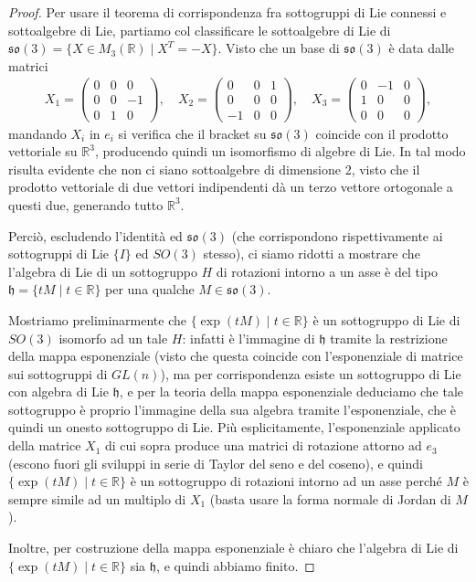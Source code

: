 \documentclass[a4paper]{article}
\newcommand{\R}{\mathbb{R}}
\theoremstyle{definition}
\theoremstyle{definition}
\theoremstyle{remark}
\theoremstyle{definition}
\begin{document}
\begin{proof}
    Per usare il teorema di corrispondenza fra sottogruppi di Lie connessi e sottoalgebre di Lie, partiamo col classificare le sottoalgebre di Lie di $\mathfrak{so}(3) = \{X\in M_3(\R) \mid X^T = -X\}$.
    Visto che un base di
    $\mathfrak{so}(3)$ è data dalle matrici
    \begin{align*}
        X_1 = \begin{pmatrix}
            0 & 0 & 0 \\
            0 & 0 & -1 \\
            0 & 1 & 0
        \end{pmatrix}, \quad
        X_2 = \begin{pmatrix}
            0 & 0 & 1 \\
            0 & 0 & 0 \\
            -1 & 0 & 0
        \end{pmatrix}, \quad
        X_3 = \begin{pmatrix}
            0 & -1 & 0 \\
            1 & 0 & 0 \\
            0 & 0 & 0
        \end{pmatrix},
    \end{align*}
    mandando $X_i$ in $e_i$ si verifica che il bracket su $\mathfrak{so}(3)$ coincide con il prodotto vettoriale su $\R^3$, producendo quindi un isomorfismo di algebre di Lie. In
    tal modo risulta evidente che non ci siano sottoalgebre di dimensione 2, visto che il prodotto vettoriale di due vettori indipendenti dà un terzo vettore ortogonale a questi
    due, generando tutto $\R^3$.

    Perciò, escludendo l'identità ed $\mathfrak{so}(3)$ (che corrispondono rispettivamente ai sottogruppi di Lie $\{I\}$ ed $SO(3)$ stesso), ci siamo ridotti a mostrare che l'algebra di Lie
    di un sottogruppo $H$ di
    rotazioni intorno a un asse è del tipo $\mathfrak{h}=\{tM \mid t\in\R\}$ per una qualche $M\in\mathfrak{so}(3)$.

    Mostriamo preliminarmente che $\{\exp(tM) \mid t\in\R\}$ è un
    sottogruppo di Lie di $SO(3)$ isomorfo ad un tale $H$: infatti è l'immagine di $\mathfrak{h}$ tramite la restrizione della mappa esponenziale (visto che questa coincide con
    l'esponenziale di matrice sui sottogruppi di $GL(n)$), ma per corrispondenza esiste un sottogruppo di Lie con algebra di Lie $\mathfrak{h}$, e per la teoria della mappa
    esponenziale deduciamo che tale sottogruppo è proprio l'immagine della sua algebra tramite l'esponenziale, che è quindi un onesto sottogruppo di Lie.
    Più esplicitamente, l'esponenziale applicato della matrice
    $X_1$ di cui
    sopra produce una matrici di rotazione attorno ad $e_3$ (escono fuori gli sviluppi in serie di Taylor del seno e del coseno), e quindi $\{\exp(tM) \mid t\in\R\}$ è
    un sottogruppo di rotazioni intorno ad un asse perché $M$ è sempre simile ad un multiplo di $X_1$ (basta usare la forma normale di Jordan di $M$).

    Inoltre, per costruzione della mappa esponenziale è chiaro che l'algebra di Lie di $\{\exp(tM) \mid t\in\R\}$ sia $\mathfrak{h}$, e quindi abbiamo finito.
\end{proof}
\end{document}
